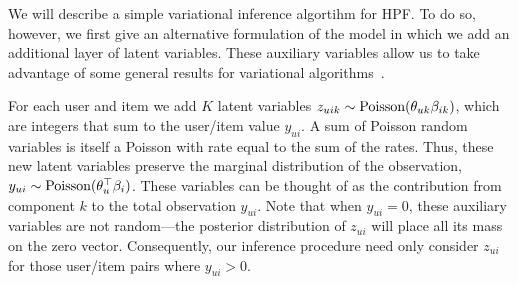 
We will describe a simple variational inference algortihm for HPF.  To
do so, however, we first give an alternative formulation of the model
in which we add an additional layer of latent variables.  These
auxiliary variables allow us to take advantage of some general results
for variational algorithms~\cite{Ghahramani:2001,Hoffman:2013}.

For each user and item we add $K$ latent variables $z_{uik} \sim
\textrm{Poisson}(\theta_{uk} \beta_{ik})$, which are integers that sum to the
user/item value $y_{ui}$.  A sum of Poisson random variables is itself
a Poisson with rate equal to the sum of the rates.  Thus, these new
latent variables preserve the marginal distribution of the
observation, $y_{ui} \sim \textrm{Poisson}(\theta_{u}^\top \beta_{i})$.  These
variables can be thought of as the contribution from component $k$ to
the total observation $y_{ui}$.  Note that when $y_{ui} = 0$, these
auxiliary variables are not random---the posterior distribution of
$z_{ui}$ will place all its mass on the zero vector.  Consequently,
our inference procedure need only consider $z_{ui}$ for those
user/item pairs where $y_{ui} > 0$.


